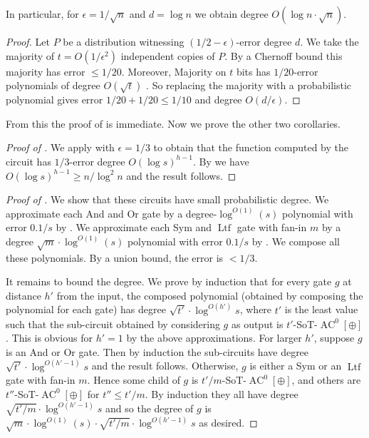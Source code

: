\documentclass{toc}
\DeclareMathOperator{\Ltf}{\mathrm{Ltf}}  %
\DeclareMathOperator{\AC}{\mathrm{AC}}  %
\newcommand{\e}{\epsilon}
\begin{document}
In particular, for $\e=1/\sqrt{n}$ and $d=\log n$ we obtain degree
$O(\log n\cdot\sqrt{n})$.
\begin{proof}
Let $P$ be a distribution witnessing $(1/2-\e)$-error degree $d$.
We take the majority of $t=O(1/\e^{2})$ independent copies of $P$.
By a Chernoff bound this majority has error $\le1/20$. Moreover,
Majority on $t$ bits has $1/20$-error polynomials of degree $O(\sqrt{t})$
\cite{DBLP:conf/focs/AlmanW15}. So replacing the majority with a
probabilistic polynomial gives error $1/20+1/20\le1/10$ and degree
$O(d/\e)$.
\end{proof}
From this the proof of  is immediate.
Now we prove the other two corollaries.
\begin{proof}[Proof of ]
	We apply 
with $\e=1/3$ to obtain that the function computed by the circuit
has $1/3$-error degree $O(\log s)^{h-1}$. By 
we have $O(\log s)^{h-1}\ge n/\log^{2}n$ and the result follows.
\end{proof}
%
\begin{proof}[Proof of ] We show that these
circuits have small probabilistic degree. We approximate each And
and Or gate by a degree-$\log^{O(1)}(s)$ polynomial with error $0.1/s$
by . We approximate each Sym and $\Ltf$ gate
with fan-in $m$ by a degree $\sqrt{m}\cdot\log^{O(1)}(s)$ polynomial
with error $0.1/s$ by  .
We compose all these polynomials. By a union bound, the error is $<1/3$.

It remains to bound the degree. We prove by induction that for every
gate $g$ at distance $h'$ from the input, the composed polynomial
(obtained by composing the polynomial for each gate) has degree $\sqrt{t'}\cdot\log^{O(h')}s$,
where $t'$ is the least value such that the sub-circuit obtained
by considering $g$ as output is $t'$-SoT-$\AC^{0}[\oplus]$. This
is obvious for $h'=1$ by the above approximations. For larger $h'$,
suppose $g$ is an And or Or gate. Then by induction the sub-circuits
have degree $\sqrt{t'}\cdot\log^{O(h'-1)}s$ and the result follows.
Otherwise, $g$ is either a Sym or an $\Ltf$ gate with fan-in $m$. Hence
some child of $g$ is $t'/m$-SoT-$\AC^{0}[\oplus]$, and others are
$t''$-SoT-$\AC^{0}[\oplus]$ for $t''\le t'/m$. By induction they
all have degree $\sqrt{t'/m}\cdot\log^{O(h'-1)}s$ and so the degree
of $g$ is $\sqrt{m}\cdot\log^{O(1)}(s)\cdot\sqrt{t'/m}\cdot\log^{O(h'-1)}s$
as desired.
\end{proof}
\end{document}
